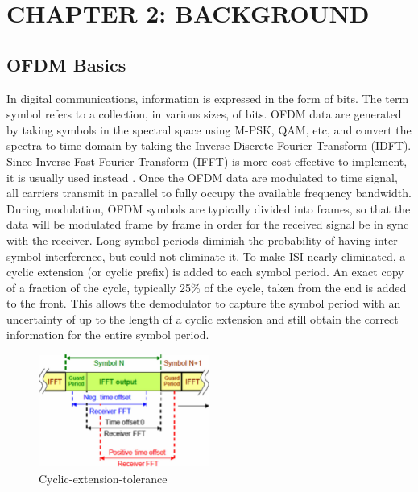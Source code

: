 \section*{CHAPTER 2: BACKGROUND}
\setcounter{section}{2}
\setcounter{subsection}{0}
\setcounter{figure}{0}
\setcounter{table}{0}

\subsection{OFDM Basics}

In digital communications, information is expressed in the form of bits. The term symbol refers to a collection, in various sizes, of bits. OFDM data are generated by taking symbols in the spectral space using M-PSK, QAM, etc, and convert the spectra to time domain by taking the Inverse Discrete Fourier Transform (IDFT). Since Inverse Fast Fourier Transform (IFFT) is more cost effective to implement, it is usually used instead \cite{b3}. Once the OFDM data are modulated to time signal, all carriers transmit in parallel to fully occupy the available frequency bandwidth. During modulation, OFDM symbols are typically divided into frames, so that the data will be modulated frame by frame in order for the received signal be in sync with the receiver. Long symbol periods diminish the probability of having inter-symbol interference, but could not eliminate it. To make ISI nearly eliminated, a cyclic extension (or cyclic prefix) is added to each symbol period. An exact copy of a fraction of the cycle, typically 25\% of the cycle, taken from the end is added to the front. This allows the demodulator to capture the symbol period with an uncertainty of up to the length of a cyclic extension and still obtain the correct information for the entire symbol period.

\begin{figure}[ht]
    \centering
    \includegraphics[width=0.5\textwidth]{Figures/Cyclic-extension-tolerance}
    \caption{Cyclic-extension-tolerance}
    \label{Cyclic-extension-tolerance}
\end{figure}

